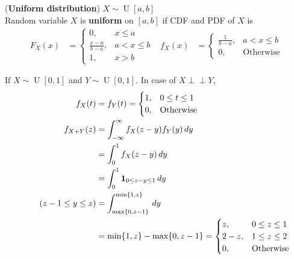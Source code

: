 \documentclass{huhtakm-template-book}
\newcommand{\independent}{\perp\!\!\!\perp}
\DeclareMathOperator{\U}{U}
\begin{document}
\begin{eg}(\textbf{Uniform distribution}) $X\sim\U[a,b]$\\
	Random variable $X$ is \textbf{uniform} on $[a,b]$ if CDF and PDF of $X$ is
	\begin{align*}
		F_{X}(x)&=\begin{cases}
			0, &x\leq a\\
			\frac{x-a}{b-a}, &a<x\leq b\\
			1, &x>b
		\end{cases} & f_{X}(x)&=\begin{cases}
			\frac{1}{b-a}, &a<x\leq b\\
			0, &\text{Otherwise}
		\end{cases}
	\end{align*}
\end{eg}
\begin{eg}
	If $X\sim\U[0,1]$ and $Y\sim\U[0,1]$. In case of $X\independent Y$,
	\begin{align*}
		f_{X}(t)&=f_{Y}(t)=\begin{cases}
			1, &0\leq t\leq 1\\
			0, &\text{Otherwise}
		\end{cases}\\
		f_{X+Y}(z)&=\int_{-\infty}^{\infty} f_{X}(z-y)f_{Y}(y)\,dy\\
		&=\int_{0}^{1}f_{X}(z-y)\,dy\\
		&=\int_{0}^{1}\mathbf{1}_{0\leq z-y\leq 1}\,dy\\
		\tag{$z-1\leq y\leq z$}
		&=\int_{\max\{0,z-1\}}^{\min\{1,z\}}\,dy\\
		&=\min\{1,z\}-\max\{0,z-1\}=\begin{cases}
			z, &0\leq z\leq 1\\
			2-z, &1\leq z\leq 2\\
			0, &\text{Otherwise}
		\end{cases}
	\end{align*}
\end{eg}
\end{document}
